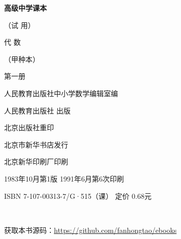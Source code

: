 \begin{titlepage}
    \begin{center}
        \vspace*{3cm}

        {\Large \textbf{高级中学课本} }

        {\Large（试 用）}

        \vspace{1cm}

        {\Huge 代 \qquad 数}

        \vspace{0.5cm}

        {\Large （甲种本）}

        {\Large 第一册}

        \vspace{1cm}
        {\Large 人民教育出版社中小学数学编辑室编}

        \vfill


        人民教育出版社 出版

        北京出版社重印

        北京市新华书店发行

        北京新华印刷厂印刷

        1983年10月第1版  \qquad 1991年6月第6次印刷

        ISBN 7-107-00313-7/G·515（课） \quad 定价 0.68元

        \,

        获取本书源码：\url{https://github.com/fanhongtao/ebooks}
    \end{center}
\end{titlepage}
